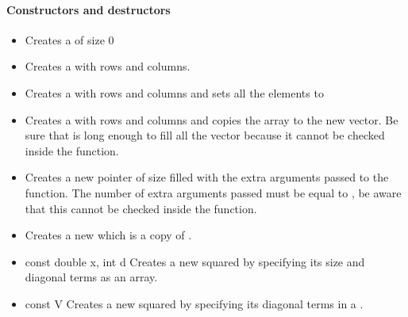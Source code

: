 \paragraph{Constructors and destructors}
\begin{itemize}
  \item {}
  \sshortdescribe Creates a  of size 0

\item {}
  \sshortdescribe Creates a   with  rows and  columns.

\item {}
  \sshortdescribe Creates a  with  rows and 
  columns and sets all the elements to 

\item {}
  \sshortdescribe Creates a  with  rows and 
  columns and copies the array  to the new vector. Be sure that 
  is long enough to fill all the vector because it cannot be checked inside the function.

\item {}
  \sshortdescribe Creates a new  pointer of size  filled with the extra arguments passed to the function. The
  number of extra arguments passed must be equal to , be
  aware that this cannot be checked inside the function.

\item {}
  \sshortdescribe Creates a new  which is a copy of .
  
\item {}
  {const double \ptr x, int d}
  \sshortdescribe Creates a new squared  by specifying its size and
  diagonal terms as an array.

\item {}
  {const  \ptr V}
  \sshortdescribe Creates a new squared  by specifying its diagonal
  terms in a .


\end{itemize}
